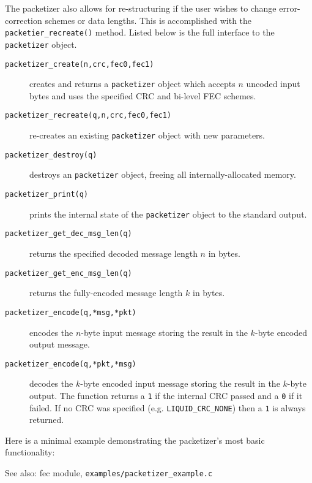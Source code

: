 
The packetizer also allows for re-structuring if the user wishes to change
error-correction schemes or data lengths.  This is accomplished with the
{\tt packetier\_recreate()} method.
Listed below is the full interface to the {\tt packetizer} object.
%
\begin{description}
\item[{\tt packetizer\_create(n,crc,fec0,fec1)}]
    creates and returns a {\tt packetizer} object which accepts $n$
    uncoded input bytes and uses the specified CRC and bi-level FEC
    schemes.
\item[{\tt packetizer\_recreate(q,n,crc,fec0,fec1)}]
    re-creates an existing {\tt packetizer} object with new parameters.
\item[{\tt packetizer\_destroy(q)}]
    destroys an {\tt packetizer} object, freeing all
    internally-allocated memory.
\item[{\tt packetizer\_print(q)}]
    prints the internal state of the {\tt packetizer} object to the
    standard output.
\item[{\tt packetizer\_get\_dec\_msg\_len(q)}]
    returns the specified decoded message length $n$ in bytes.
\item[{\tt packetizer\_get\_enc\_msg\_len(q)}]
    returns the fully-encoded message length $k$ in bytes.
\item[{\tt packetizer\_encode(q,*msg,*pkt)}]
    encodes the $n$-byte input message storing the result in the
    $k$-byte encoded output message.
\item[{\tt packetizer\_encode(q,*pkt,*msg)}]
    decodes the $k$-byte encoded input message storing the result in the
    $k$-byte output.
    The function returns a {\tt 1} if the internal CRC passed
    and a {\tt 0} if it failed.
    If no CRC was specified (e.g. {\tt LIQUID\_CRC\_NONE}) then a {\tt 1} is
    always returned.
\end{description}
%
Here is a minimal example demonstrating the packetizer's most basic
functionality:
%

%
See also: fec module, {\tt examples/packetizer\_example.c}


%
%
